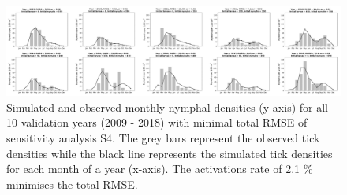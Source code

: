 \documentclass[a4paper, 11pt]{scrartcl}
\begin{document}
\begin{figure}
\centering
\includegraphics[width=\linewidth]{figures/independent_initial_ticks_without_beech.png}
\caption{Simulated and observed monthly nymphal densities (y-axis) for all 10 validation years (2009 - 2018) with minimal total RMSE of sensitivity analysis S4. The grey bars
represent the observed tick densities while the black line represents the simulated tick densities for each month of a year (x-axis). The activations rate of 2.1 \% minimises
the total RMSE.}
\label{fig:independent_initial_ticks_without_beech_rotated}
\end{figure}
\end{document}
